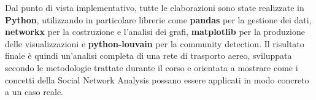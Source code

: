 Dal punto di vista implementativo, tutte le elaborazioni sono state realizzate in \textbf{Python}, utilizzando in particolare librerie come \textbf{pandas} per la gestione dei dati, \textbf{networkx} per la costruzione e l’analisi dei grafi, \textbf{matplotlib} per la produzione delle visualizzazioni e \textbf{python-louvain} per la community detection. Il risultato finale è quindi un’analisi completa di una rete di trasporto aereo, sviluppata secondo le metodologie trattate durante il corso e orientata a mostrare come i concetti della Social Network Analysis possano essere applicati in modo concreto a un caso reale.